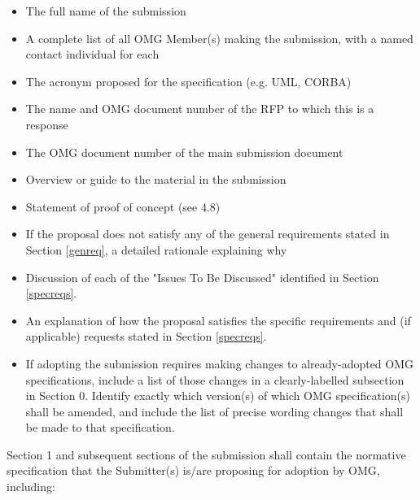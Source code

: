 \begin{itemize}
\renewcommand\labelitemi{-}
\item The full name of the submission
\item A complete list of all OMG Member(s) making the submission, with a named contact individual for each
\item The acronym proposed for the specification (e.g. UML, CORBA)
\item The name and OMG document number of the RFP to which this is a response
\item The OMG document number of the main submission document
\item Overview or guide to the material in the submission
\item Statement of proof of concept (see 4.8)
\item If the proposal does not satisfy any of the general requirements stated in Section \ref{genreq}, a detailed rationale explaining why
\item Discussion of each of the "Issues To Be Discussed" identified in Section \ref{specreqs}.
\item An explanation of how the proposal satisfies the specific requirements and (if applicable) requests stated in Section \ref{specreqs}.
\item If adopting the submission requires making changes to already-adopted OMG specifications, include a list of those changes in a clearly-labelled subsection in Section 0. Identify exactly which version(s) of which OMG specification(s) shall be amended, and include the list of precise wording changes that shall be made to that specification.
\end{itemize}
Section 1 and subsequent sections of the submission shall contain the normative specification that the Submitter(s) is/are proposing for adoption by OMG, including:

